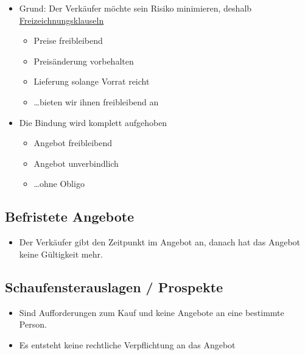 \documentclass[a4paper,11pt]{scrartcl}	%
\begin{document}
\begin{itemize}
	\item Grund: Der Verkäufer möchte sein Risiko minimieren, deshalb \underline{Freizeichnungsklauseln}
		\begin{itemize}
			\item Preise freibleibend
			\item Preisänderung vorbehalten
			\item Lieferung solange Vorrat reicht
			\item \dots bieten wir ihnen freibleibend an
		\end{itemize}
	\item Die Bindung wird komplett aufgehoben
	\begin{itemize}
		\item Angebot freibleibend
		\item Angebot unverbindlich
		\item \dots ohne Obligo
	\end{itemize}
\end{itemize}

\subsection{Befristete Angebote}

\begin{itemize}
	\item Der Verkäufer gibt den Zeitpunkt im Angebot an, danach hat das Angebot keine Gültigkeit mehr.
\end{itemize}

\subsection{Schaufensterauslagen / Prospekte}
\begin{itemize}
	\item Sind Aufforderungen zum Kauf und keine Angebote an eine bestimmte Person.
	\item Es entsteht keine rechtliche Verpflichtung an das Angebot
\end{itemize}
\end{document}
